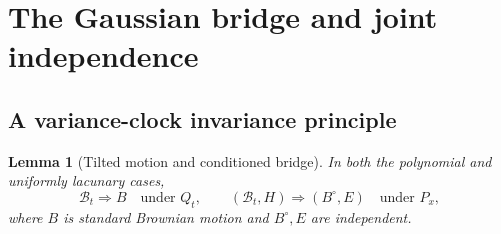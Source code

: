 \documentclass[11pt,a4paper]{article}
\numberwithin{equation}{section}
\newtheorem{lemma}[theorem]{Lemma}
\theoremstyle{definition}
\theoremstyle{remark}
\begin{document}
\section{The Gaussian bridge and joint independence}
\label{sec:bridge}

\subsection{A variance-clock invariance principle}
\begin{lemma}[Tilted motion and conditioned bridge]
\label{lem:bridge}
In both the polynomial and uniformly lacunary cases,
\begin{equation}
 \mathcal B_t\Rightarrow B\quad\text{under }Q_t,
 \qquad
 (\mathcal B_t,H)\Rightarrow(B^\circ,E)
       \quad\text{under }P_x, \label{eq:bridges}
\end{equation}
where $B$ is standard Brownian motion and $B^\circ,E$ are independent.
\end{lemma}
\end{document}
